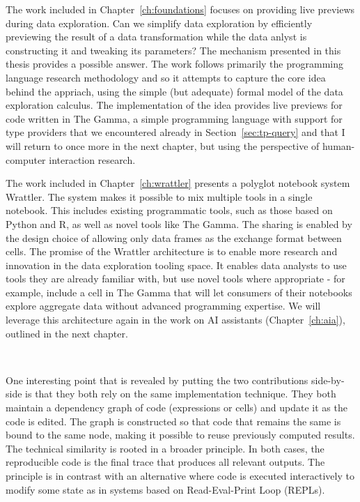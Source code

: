 \documentclass[fleqn,11pt]{report}
\theoremstyle{definition}
\begin{document}
The work included in Chapter~\ref{ch:foundations} focuses on providing live previews during
data exploration. Can we simplify data exploration by efficiently previewing the result of
a data transformation while the data anlyst is constructing it and tweaking its parameters?
The mechanism presented in this thesis provides a possible answer. The work follows primarily
the programming language research methodology and so it attempts to capture the core idea
behind the appriach, using the simple (but adequate) formal model of the data exploration calculus.
The implementation of the idea provides live previews for code written in The Gamma, a simple
programming language with support for type providers that we encountered already in
Section~\ref{sec:tp-query} and that I will return to once more in the next chapter, but using
the perspective of human-computer interaction research.

The work included in Chapter~\ref{ch:wrattler} presents a polyglot notebook system Wrattler.
The system makes it possible to mix multiple tools in a single notebook. This includes
existing programmatic tools, such as those based on Python and R, as well as novel tools like
The Gamma. The sharing is enabled by the design choice of allowing only data frames as the
exchange format between cells. The promise of the Wrattler architecture is to enable more research
and innovation in the data exploration tooling space. It enables data analysts to use tools they
are already familiar with, but use novel tools where appropriate - for example, include a cell in
The Gamma that will let consumers of their notebooks explore aggregate data without advanced
programming expertise. We will leverage this architecture again in the work on AI assistants
(Chapter~\ref{ch:aia}), outlined in the next chapter.

~

One interesting point that is revealed by putting the two contributions side-by-side is that they
both rely on the same implementation technique. They both maintain a dependency graph of
code (expressions or cells) and update it as the code is edited. The graph is constructed so that
code that remains the same is bound to the same node, making it possible to reuse previously
computed results. The technical similarity is rooted in a broader principle. In both cases,
the reproducible code is the final trace that produces all relevant outputs. The principle is
in contrast with an alternative where code is executed interactively to modify some state
as in systems based on Read-Eval-Print Loop (REPLs).
\end{document}
